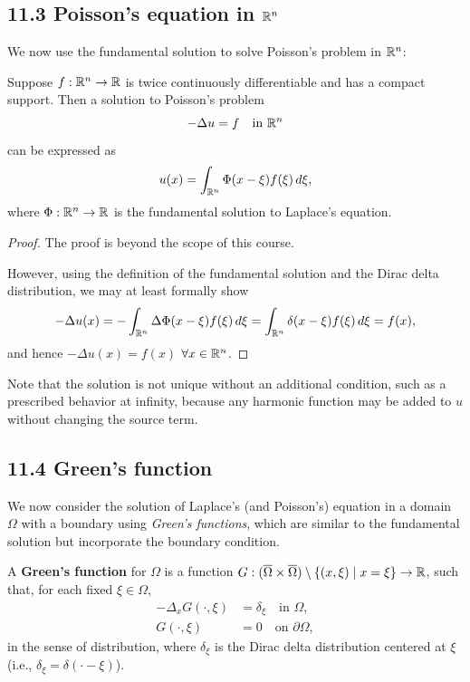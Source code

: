 \subsection{11.3 Poisson's equation in $\mathbb{R}^n$}
We now use the fundamental solution to solve Poisson's problem in $\mathbb{R}^n$:

\begin{theorem}[][11.2]
    Suppose $f : \mathbb{R}^n \to \mathbb{R}$ is twice continuously differentiable and has a compact support. Then a solution to Poisson's problem
    \[-\Delta u = f \quad \text{in } \mathbb{R}^n\]
    can be expressed as
    \[u(x) = \int_{\mathbb{R}^n} \Phi(x - \xi)f(\xi)\,d\xi,\]
    where $\Phi : \mathbb{R}^n \to \mathbb{R}$ is the fundamental solution to Laplace's equation.
\end{theorem}
\begin{proof}
    The proof is beyond the scope of this course.

    However, using the definition of the fundamental solution and the Dirac delta distribution, we may at least formally show
    \[-\Delta u(x) = -\int_{\mathbb{R}^n} \Delta\Phi(x - \xi)f(\xi)\,d\xi = \int_{\mathbb{R}^n} \delta(x - \xi)f(\xi)\,d\xi = f(x),\]
    and hence $-\Delta u(x) = f(x)$ $\forall x \in \mathbb{R}^n$.
\end{proof}

Note that the solution is not unique without an additional condition, such as a prescribed behavior at infinity, because any harmonic function may be added to $u$ without changing the source term.

\subsection{11.4 Green's function}
We now consider the solution of Laplace's (and Poisson's) equation in a domain $\Omega$ with a boundary using \textit{Green's functions}, which are similar to the fundamental solution but incorporate the boundary condition.

\begin{definition}
    A \textbf{Green's function} for $\Omega$ is a function $G : (\overline{\Omega} \times \overline{\Omega}) \setminus \{(x, \xi) \mid x = \xi\} \to \mathbb{R}$, such that, for each fixed $\xi \in \Omega$,
    \begin{align*}
        -\Delta_xG(\cdot, \xi) &= \delta_\xi \quad \text{in } \Omega, \\
        G(\cdot, \xi) &= 0 \quad \text{on } \partial\Omega,
    \end{align*}
    in the sense of distribution, where $\delta_\xi$ is the Dirac delta distribution centered at $\xi$ (i.e., $\delta_\xi = \delta(\cdot - \xi)$).
\end{definition}

